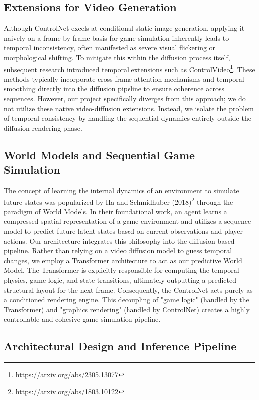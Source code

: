 \documentclass[twocolumn,a4paper]{article}
\begin{document}
\subsection{Extensions for Video Generation}

Although ControlNet excels at conditional static image generation, applying it naively on a frame-by-frame basis for game simulation inherently leads to temporal inconsistency, often manifested as severe visual flickering or morphological shifting. To mitigate this within the diffusion process itself, subsequent research introduced temporal extensions such as ControlVideo\footnote{\url{https://arxiv.org/abs/2305.13077}}. These methods typically incorporate cross-frame attention mechanisms and temporal smoothing directly into the diffusion pipeline to ensure coherence across sequences. However, our project specifically diverges from this approach; we do not utilize these native video-diffusion extensions. Instead, we isolate the problem of temporal consistency by handling the sequential dynamics entirely outside the diffusion rendering phase.

\subsection{World Models and Sequential Game Simulation}

The concept of learning the internal dynamics of an environment to simulate future states was popularized by Ha and Schmidhuber (2018)\footnote{\url{https://arxiv.org/abs/1803.10122}} through the paradigm of World Models. In their foundational work, an agent learns a compressed spatial representation of a game environment and utilizes a sequence model to predict future latent states based on current observations and player actions. Our architecture integrates this philosophy into the diffusion-based pipeline. Rather than relying on a video diffusion model to guess temporal changes, we employ a Transformer architecture to act as our predictive World Model. The Transformer is explicitly responsible for computing the temporal physics, game logic, and state transitions, ultimately outputting a predicted structural layout for the next frame. Consequently, the ControlNet acts purely as a conditioned rendering engine. This decoupling of "game logic" (handled by the Transformer) and "graphics rendering" (handled by ControlNet) creates a highly controllable and cohesive game simulation pipeline.

\subsection{Architectural Design and Inference Pipeline}
\end{document}
